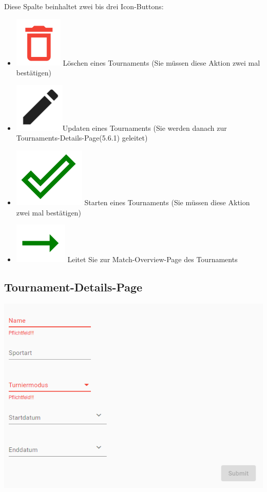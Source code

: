Diese Spalte beinhaltet zwei bis drei Icon-Buttons:
\begin{itemize}
    \item \includegraphics[scale=0.3]{pics/user-guide/delete-icon.PNG} Löschen eines Tournaments (Sie müssen diese Aktion zwei mal bestätigen)
    \item \includegraphics[scale=0.3]{pics/user-guide/edit-icon.PNG}Updaten eines Tournaments (Sie werden danach zur Tournaments-Details-Page(5.6.1) geleitet)
    \item \includegraphics[scale=0.3]{pics/user-guide/submit-icon.PNG} Starten eines Tournaments (Sie müssen diese Aktion zwei mal bestätigen)
    \item \includegraphics[scale=0.3]{pics/user-guide/go-to-icon.PNG} Leitet Sie zur Match-Overview-Page des Tournaments
\end{itemize}

\subsection{Tournament-Details-Page}
\includegraphics[scale=0.6]{pics/user-guide/tournament-create-page.PNG}

